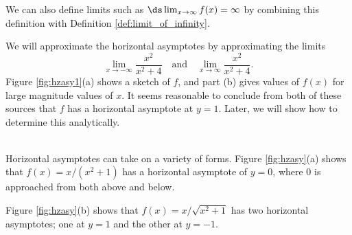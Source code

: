 
We can also define limits such as $\ds\lim_{x\rightarrow\infty}f(x)=\infty$ by combining this definition with Definition \ref{def:limit_of_infinity}. \\ %

{}
{We will approximate the horizontal asymptotes by approximating the limits 
\[
\lim_{x\to-\infty} \frac{x^2}{x^2+4}\quad \text{and}\quad \lim_{x\to\infty} \frac{x^2}{x^2+4}.
\]
Figure \ref{fig:hzasy1}(a) shows a sketch of $f$, and part (b) gives values of $f(x)$ for large magnitude values of $x$. It seems reasonable to conclude from both of these sources that $f$ has a horizontal asymptote at $y=1$. Later, we will show how to determine this analytically.

}\\

Horizontal asymptotes can take on a variety of forms. Figure \ref{fig:hzasy}(a) shows that $f(x) = x/(x^2+1)$ has a horizontal asymptote of $y=0$, where 0 is approached from both above and below.


Figure \ref{fig:hzasy}(b) shows that $f(x) =x/\sqrt{x^2+1}$ has two horizontal asymptotes; one at $y=1$ and the other at $y=-1$.

